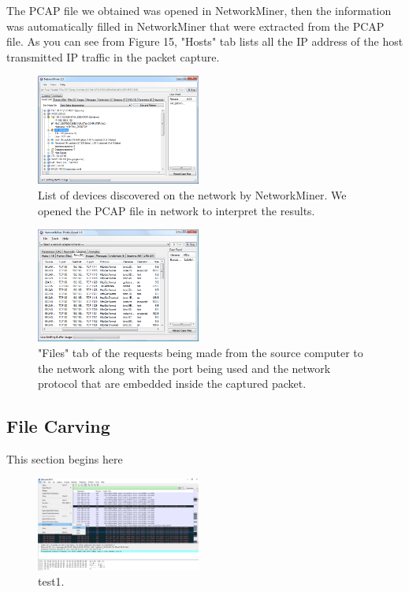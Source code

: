 \documentclass{article}
\begin{document}
The PCAP file we obtained was opened in NetworkMiner, then the information was automatically filled in NetworkMiner that were extracted from the PCAP file. As you can see from Figure 15, "Hosts" tab lists all the IP address of the host transmitted IP traffic in the packet capture. 
\begin{figure}[H]
	\begin{center}
		\includegraphics[width=0.48\textwidth]{FINDINGANN1.png}
	\end{center}
	\caption{List of devices discovered on the network by NetworkMiner. We opened the PCAP file in network to interpret the results. }
	\label{fig:Prd}
\end{figure}

\begin{figure}[H]
	\begin{center}
		\includegraphics[width=0.48\textwidth]{FINDINGANN2.png}
	\end{center}
	\caption{"Files" tab of the requests being made from the source computer to the network along with the port being used and the network protocol that are embedded inside the captured packet.}
	\label{fig:Prd}
\end{figure}

\subsection{File Carving}
This section begins here
\begin{figure}[H]
	\begin{center}
		\includegraphics[width=0.48\textwidth]{FILECARVING1.png}
	\end{center}
	\caption{test1.}
	\label{fig:Prd}
\end{figure}
\end{document}
